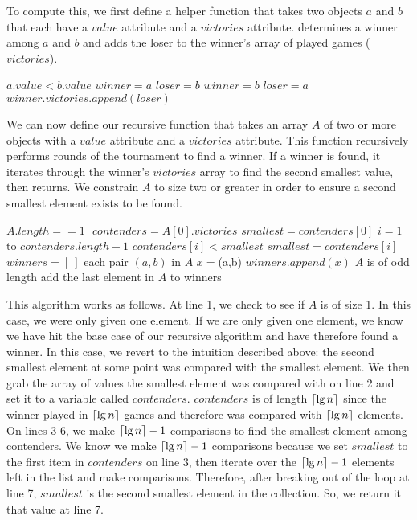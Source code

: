 \documentclass[11pt]{article}
\DeclarePairedDelimiter{\ceil}{\lceil}{\rceil}
\begin{document}
To compute this, we first define a helper function  that takes two objects $a$ and $b$ that each have a $value$ attribute and a $victories$ attribute.  determines a winner among $a$ and $b$ and adds the loser to the winner's array of played games ($victories$).

\begin{codebox}
\li \If $a.value < b.value$ \Do
\li     $winner = a$
\li     $loser = b$
    \End
\li \Else \Do
\li     $winner = b$
\li     $loser = a$
\li \End
\li $winner.victories.append(loser)$
\li {}
\end{codebox}

We can now define our recursive function  that takes an array $A$ of two or more objects with a $value$ attribute and a $victories$ attribute. This function recursively performs rounds of the tournament to find a winner. If a winner is found, it iterates through the winner's $victories$ array to find the second smallest value, then returns. We constrain $A$ to size two or greater in order to ensure a second smallest element exists to be found.

\begin{codebox}
\li \If $A.length == 1$ $    $  \Do
\li     $contenders = A[0].victories$
\li     $smallest = contenders[0]$
\li     \For $i=1$ to $contenders.length - 1$ \Do
\li         \If $contenders[i] < smallest$ \Do
\li             $smallest = contenders[i]$
            \End
        \End
\li     {}
\li \End
\li \Else \Do
\li     $winners = [~]$
\li     \For each pair $(a,b)$ in $A$ \Do
\li         $x = $(a,b)
\li         $winners.append(x)$
        \End
\li     \If $A$ is of odd length \Do
\li         add the last element in $A$ to winners
        \End
\li     {}
    \End
\end{codebox}

This algorithm works as follows. At line 1, we check to see if $A$ is of size 1. In this case, we were only given one element. If we are only given one element, we know we have hit the base case of our recursive algorithm and have therefore found a winner. In this case, we revert to the intuition described above: the second smallest element at some point was compared with the smallest element. We then grab the array of values the smallest element was compared with on line 2 and set it to a variable called $contenders$. $contenders$ is of length $\ceil{\lg{n}}$ since the winner played in $\ceil{\lg{n}}$ games and therefore was compared with $\ceil{\lg{n}}$ elements. On lines 3-6, we make $\ceil{\lg{n}} - 1$ comparisons to find the smallest element among contenders. We know we make $\ceil{\lg{n}} - 1$ comparisons because we set $smallest$ to the first item in $contenders$ on line 3, then iterate over the $\ceil{\lg{n}} - 1$ elements left in the list and make comparisons. Therefore, after breaking out of the loop at line 7, $smallest$ is the second smallest element in the collection. So, we return it that value at line 7.
\end{document}
